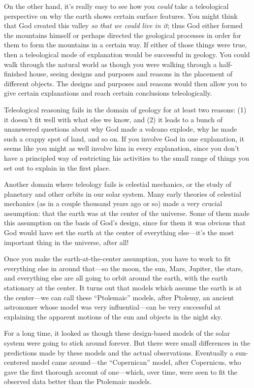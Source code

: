 		On the other hand, it's really easy to see how you \textit{could} take a teleological perspective on why the earth shows certain surface features. You might think that God created this valley \textit{so that we could live in it}; thus God either formed the mountains himself or perhaps directed the geological processes in order for them to form the mountains in a certain way. If either of those things were true, then a teleological mode of explanation would be successful in geology. You could walk through the natural world as though you were walking through a half-finished house, seeing designs and purposes and reasons in the placement of different objects. The designs and purposes and reasons would then allow you to give certain explanations and reach certain conclusions teleologically.
		
		Teleological reasoning fails in the domain of geology for at least two reasons: (1) it doesn't fit well with what else we know, and (2) it leads to a bunch of unanswered questions about why God made a volcano explode, why he made such a crappy spot of land, and so on. If you involve God in one explanation, it seems like you might as well involve him in every explanation, since you don't have a principled way of restricting his activities to the small range of things you set out to explain in the first place.
		
		Another domain where teleology fails is celestial mechanics, or the study of planetary and other orbits in our solar system. Many early theories of celestial mechanics (as in a couple thousand years ago or so) made a very crucial assumption: that the earth was at the center of the universe. Some of them made this assumption on the basis of God's design, since for them it was obvious that God would have set the earth at the center of everything else---it's the most important thing in the universe, after all!
		
		Once you make the earth-at-the-center assumption, you have to work to fit everything else in around that---so the moon, the sun, Mars, Jupiter, the stars, and everything else are all going to orbit around the earth, with the earth stationary at the center. It turns out that models which assume the earth is at the center---we can call these ``Ptolemaic'' models, after Ptolemy, an ancient astronomer whose model was very influential---can be very successful at explaining the apparent motions of the sun and objects in the night sky.
		
		For a long time, it looked as though these design-based models of the solar system were going to stick around forever. But there were small differences in the predictions made by these models and the actual observations. Eventually a sun-centered model came around---the ``Copernican'' model, after Copernicus, who gave the first thorough account of one---which, over time, were seen to fit the observed data better than the Ptolemaic models.
		
